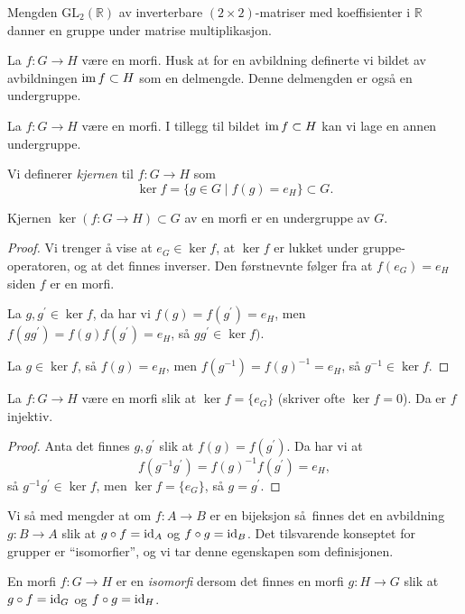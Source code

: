 \begin{example}
    Mengden $\mathrm{GL}_2(\mathbb R)$ av inverterbare $(2\times2)$-matriser
    med koeffisienter i $\mathbb R$
    danner en gruppe under matrise multiplikasjon.
\end{example}

\begin{example}
    La $f\colon G\to H$ være en morfi.
    Husk at for en avbildning definerte vi bildet av avbildningen
    $\operatorname{im} f\subset H$ som en delmengde.
    Denne delmengden er også en undergruppe.
\end{example}

La $f\colon G\to H$ være en morfi.
I tillegg til bildet $\operatorname{im} f\subset H$ kan vi lage en annen undergruppe.
\begin{definition}
    Vi definerer \textit{kjernen} til $f\colon G\to H$
    som
    \[
        \ker f = \{ g\in G\mid f(g) = e_H\} \subset G.
    \]
\end{definition}

\begin{lemma}
    Kjernen $\ker (f\colon G\to H)\subset G$ av en morfi er en undergruppe av $G$.
\end{lemma}
\begin{proof}
    Vi trenger å vise at $e_G\in \ker f$, at $\ker f$ er lukket under
    gruppe-operatoren, og at det finnes inverser.
    Den førstnevnte følger fra at $f(e_G) = e_H$ siden $f$ er en morfi.

    La $g,g^\prime \in\ker f$, da har vi $f(g) = f(g^\prime) = e_H$,
    men $f(gg^\prime) = f(g)f(g^\prime) = e_H$, så $gg^\prime\in \ker f)$.

    La $g\in \ker f$, så $f(g) = e_H$, men $f(g^{-1}) = {f(g)}^{-1} = e_H$,
    så $g^{-1}\in\ker f$.
\end{proof}

\begin{corollary}
    La $f\colon G\to H$ være en morfi slik at $\ker f = \{e_G\}$
    (skriver ofte $\ker f = 0$).
    Da er $f$ injektiv.
\end{corollary}
\begin{proof}
    Anta det finnes $g,g^\prime$ slik at $f(g) = f(g^\prime)$.
    Da har vi at
    \[
        f(g^{-1}g^\prime) = {f(g)}^{-1}f(g^\prime) = e_H,
    \]
    så $g^{-1}g^\prime\in \ker f$,
    men $\ker f = \{e_G\}$, så $g = g^\prime$.
\end{proof}

Vi så med mengder at om $f\colon A\to B$ er en bijeksjon så finnes
det en avbildning $g\colon B\to A$ slik at $g\circ f = \operatorname{id}_A$
og $f\circ g = \operatorname{id}_B$.
Det tilsvarende konseptet for grupper er ``isomorfier'',
og vi tar denne egenskapen som definisjonen.
\begin{definition}
    En morfi $f\colon G\to H$ er en \textit{isomorfi}
    dersom det finnes en morfi $g\colon H\to G$ slik at
    $g\circ f = \operatorname{id}_G$ og $f\circ g = \operatorname{id}_H$.
\end{definition}

